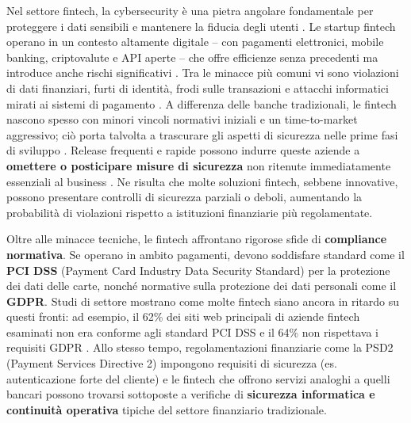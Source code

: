 \documentclass[a4paper,12pt]{report}
\begin{document}
Nel settore fintech, la cybersecurity è una pietra angolare fondamentale per proteggere i dati sensibili e mantenere la fiducia degli utenti \cite{netguru2023}. Le startup fintech operano in un contesto altamente digitale – con pagamenti elettronici, mobile banking, criptovalute e API aperte – che offre efficienze senza precedenti ma introduce anche rischi significativi \cite{netguru2023}. Tra le minacce più comuni vi sono violazioni di dati finanziari, furti di identità, frodi sulle transazioni e attacchi informatici mirati ai sistemi di pagamento \cite{netguru2023}. A differenza delle banche tradizionali, le fintech nascono spesso con minori vincoli normativi iniziali e un time-to-market aggressivo; ciò porta talvolta a trascurare gli aspetti di sicurezza nelle prime fasi di sviluppo \cite{netguru2023}. Release frequenti e rapide possono indurre queste aziende a \textbf{omettere o posticipare misure di sicurezza} non ritenute immediatamente essenziali al business \cite{netguru2023}. Ne risulta che molte soluzioni fintech, sebbene innovative, possono presentare controlli di sicurezza parziali o deboli, aumentando la probabilità di violazioni rispetto a istituzioni finanziarie più regolamentate.

Oltre alle minacce tecniche, le fintech affrontano rigorose sfide di \textbf{compliance normativa}. Se operano in ambito pagamenti, devono soddisfare standard come il \textbf{PCI DSS} (Payment Card Industry Data Security Standard) per la protezione dei dati delle carte, nonché normative sulla protezione dei dati personali come il \textbf{GDPR}. Studi di settore mostrano come molte fintech siano ancora in ritardo su questi fronti: ad esempio, il 62\% dei siti web principali di aziende fintech esaminati non era conforme agli standard PCI DSS e il 64\% non rispettava i requisiti GDPR \cite{sproWhitepaper}. Allo stesso tempo, regolamentazioni finanziarie come la PSD2 (Payment Services Directive 2) impongono requisiti di sicurezza (es. autenticazione forte del cliente) e le fintech che offrono servizi analoghi a quelli bancari possono trovarsi sottoposte a verifiche di \textbf{sicurezza informatica e continuità operativa} tipiche del settore finanziario tradizionale.
\end{document}
